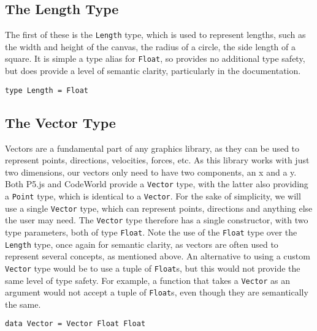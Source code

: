 \documentclass[../main.tex]{subfiles}
\begin{document}
        \subsection{The Length Type}
            The first of these is the \verb|Length| type, which is used to represent
                lengths, such as the width and height of the canvas, the radius of a circle,
                the side length of a square.
            It is simple a type alias for \verb|Float|, so provides no additional type
                safety, but does provide a level of semantic clarity, particularly in the
                documentation.
            \begin{lstlisting}[label={lst:length}, caption={The Length type definition.}]
type Length = Float\end{lstlisting}

        \subsection{The Vector Type}
            Vectors are a fundamental part of any graphics library, as they can be used to
                represent points, directions, velocities, forces, etc. As this library works
                with just two dimensions, our vectors only need to have two components, an x
                and a y.
            Both P5.js and CodeWorld provide a \verb|Vector| type, with the latter also
                providing a \verb|Point| type, which is identical to a \verb|Vector|.
            For the sake of simplicity, we will use a single \verb|Vector| type, which can
                represent points, directions and anything else the user may need.
            The \verb|Vector| type therefore has a single constructor, with two type
                parameters, both of type \verb|Float|.
            Note the use of the \verb|Float| type over the \verb|Length| type, once again
                for semantic clarity, as vectors are often used to represent several concepts,
                as mentioned above.
            An alternative to using a custom \verb|Vector| type would be to use a tuple of
                \verb|Float|s, but this would not provide the same level of type safety.
            For example, a function that takes a \verb|Vector| as an argument would not
                accept a tuple of \verb|Float|s, even though they are semantically the same.

            \begin{lstlisting}[label={lst:vector}, caption={The Vector type definition.}]
data Vector = Vector Float Float\end{lstlisting}
\end{document}
